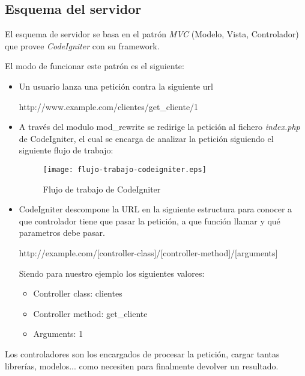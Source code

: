 \subsection{Esquema del servidor}

    El esquema de servidor se basa en el patrón \emph{MVC} (Modelo, Vista, Controlador) que provee \emph{CodeIgniter} con su framework.

    El modo de funcionar este patrón es el siguiente:

        \begin{itemize}
            \item Un usuario lanza una petición contra la siguiente url

                http://www.example.com/clientes/get\_cliente/1

            \item A través del modulo mod\_rewrite se redirige la petición al fichero \emph{index.php} de CodeIgniter, el cual se encarga de analizar la petición siguiendo el siguiente flujo de trabajo:

            \begin{figure}[H]
                \centering
                \texttt{[image: flujo-trabajo-codeigniter.eps]}
                \caption{Flujo de trabajo de CodeIgniter}\label{fig:flujo-trabajo-codeigniter}
            \end{figure}

            \item CodeIgniter descompone la URL en la siguiente estructura para conocer a que controlador tiene que pasar la petición, a que función llamar y qué parametros debe pasar.

                http://example.com/[controller-class]/[controller-method]/[arguments]

            Siendo para nuestro ejemplo los siguientes valores:

                \begin{itemize}
                    \item Controller class: clientes
                    \item Controller method: get\_cliente
                    \item Arguments: 1
                \end{itemize}
        \end{itemize}

    Los controladores son los encargados de procesar la petición, cargar tantas librerías, modelos... como necesiten para finalmente devolver un resultado.

